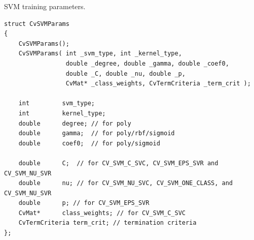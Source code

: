 SVM training parameters.

\begin{lstlisting}
struct CvSVMParams
{
    CvSVMParams();
    CvSVMParams( int _svm_type, int _kernel_type,
                 double _degree, double _gamma, double _coef0,
                 double _C, double _nu, double _p,
                 CvMat* _class_weights, CvTermCriteria _term_crit );

    int         svm_type;
    int         kernel_type;
    double      degree; // for poly
    double      gamma;  // for poly/rbf/sigmoid
    double      coef0;  // for poly/sigmoid

    double      C;  // for CV_SVM_C_SVC, CV_SVM_EPS_SVR and CV_SVM_NU_SVR
    double      nu; // for CV_SVM_NU_SVC, CV_SVM_ONE_CLASS, and CV_SVM_NU_SVR
    double      p; // for CV_SVM_EPS_SVR
    CvMat*      class_weights; // for CV_SVM_C_SVC
    CvTermCriteria term_crit; // termination criteria
};

\end{lstlisting}

